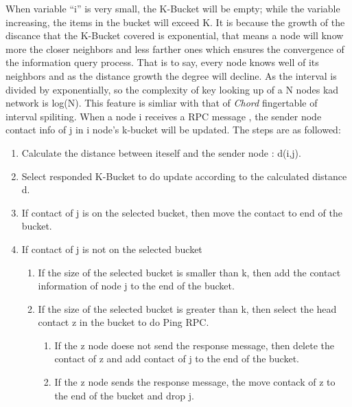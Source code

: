 {When variable ``i'' is very small, the K-Bucket will be empty; while the variable increasing, the items in the bucket will exceed K.
It is because the growth of the discance that the K-Bucket covered is exponential, that means a node will know more the closer neighbors and less farther ones which ensures the convergence of the information query process.
That is to say, every node knows well of its neighbors and as the distance growth the degree will decline.
As the interval is divided by exponentially, so the complexity of key looking up of a N nodes kad network is log(N).
This feature is simliar with that of \emph{Chord} fingertable of interval spiliting.
When a node i receives a RPC message , the sender node contact info of j in i node's k-bucket will be updated.
The steps are as followed:
\begin{enumerate}\itemsep1pt
\item Calculate the distance between iteself and the sender node : d(i,j).
\item Select responded K-Bucket to do update according to the calculated distance d.
\item If contact of j is on the selected bucket, then move the contact to end of the bucket.
\item If contact of j is not on the selected bucket
\begin{enumerate}%
\item If the size of the selected bucket is smaller than k, then add the contact information of node j to the end of the bucket.
\item If the size of the selected bucket is greater than k, then select the head contact z in the bucket to do Ping RPC.
\begin{enumerate}%
\item If the z node doese not send the response message, then delete the contact of z and add contact of j to the end of the bucket.
\item If the z node sends the response message, the move contack of z to the end of the bucket and drop j.
\end{enumerate}
\end{enumerate}
\end{enumerate}

}

